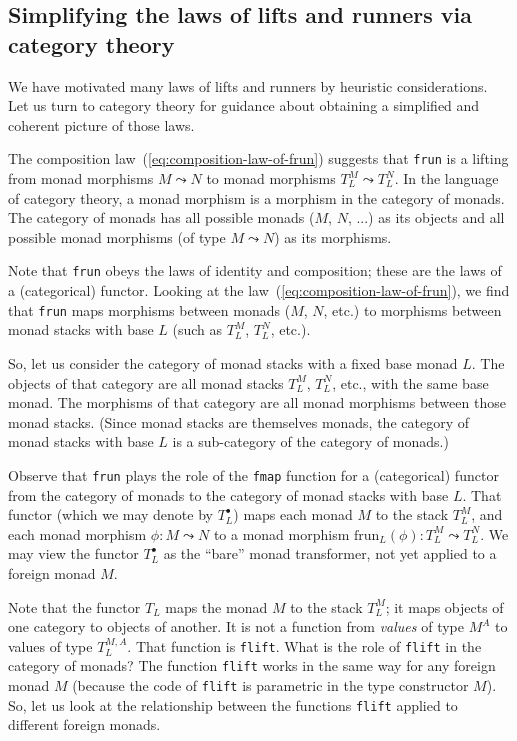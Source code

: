 \subsection{Simplifying the laws of lifts and runners via category theory\label{subsec:Category-theoretic-properties-of-lifts-and-runners-functors-in-category-of-monads}}

We have motivated many laws of lifts and runners by heuristic considerations.
Let us turn to category theory for guidance about obtaining a simplified
and coherent picture of those laws.

The composition law~(\ref{eq:composition-law-of-frun}) suggests
that \lstinline!frun! is a lifting from monad morphisms $M\leadsto N$
to monad morphisms $T_{L}^{M}\leadsto T_{L}^{N}$. In the language
of category theory, a monad morphism is a morphism in the category
of monads. The category of monads has all possible monads ($M$, $N$,
...) as its objects and all possible monad morphisms (of type $M\leadsto N$)
as its morphisms. 

Note that \lstinline!frun! obeys the laws of identity and composition;
these are the laws of a (categorical) functor. Looking at the law~(\ref{eq:composition-law-of-frun}),
we find that \lstinline!frun! maps morphisms between monads ($M$,
$N$, etc.) to morphisms between monad stacks with base $L$ (such
as $T_{L}^{M}$, $T_{L}^{N}$, etc.). 

So, let us consider the category of monad
stacks with a fixed base monad $L$. The objects of that category
are all monad stacks $T_{L}^{M}$, $T_{L}^{N}$, etc., with the same
base monad. The morphisms of that category are all monad morphisms
between those monad stacks. (Since monad stacks are themselves monads,
the category of monad stacks with base $L$ is a sub-category of the
category of monads.) 

Observe that \lstinline!frun! plays the role of the \lstinline!fmap!
function for a (categorical) functor from the category of monads to
the category of monad stacks with base $L$. That functor (which we
may denote by $T_{L}^{\bullet}$) maps each monad $M$ to the stack
$T_{L}^{M}$, and each monad morphism $\phi:M\leadsto N$ to a monad
morphism $\text{frun}_{L}(\phi):T_{L}^{M}\leadsto T_{L}^{N}$. We
may view the functor $T_{L}^{\bullet}$ as the \textsf{``}bare\textsf{''} monad transformer,
not yet applied to a foreign monad $M$.

Note that the functor $T_{L}$ maps the monad $M$ to the stack $T_{L}^{M}$;
it maps objects of one category to objects of another. It is not a
function from \emph{values} of type $M^{A}$ to values of type $T_{L}^{M,A}$.
That function is \lstinline!flift!. What is the role of \lstinline!flift!
in the category of monads? The function \lstinline!flift! works in
the same way for any foreign monad $M$ (because the code of \lstinline!flift!
is parametric in the type constructor $M$). So, let us look at the
relationship between the functions \lstinline!flift! applied to different
foreign monads.

